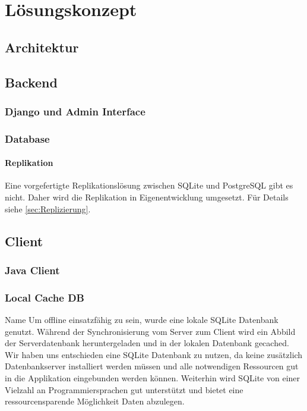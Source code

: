 \documentclass[12pt,a4paper,ngerman,english]{report}
\begin{document}
\chapter{Lösungskonzept}
\section{Architektur}
\section{Backend}
\subsection{Django und Admin Interface}
\subsection{Database}

\subsubsection{Replikation}

Eine vorgefertigte Replikationslösung zwischen SQLite und PostgreSQL gibt es nicht. Daher wird die Replikation in Eigenentwicklung umgesetzt. Für Details siehe \autoref{sec:Replizierung}.

\section{Client}
\subsection{Java Client}
\subsection{Local Cache DB}Name
Um offline einsatzfähig zu sein, wurde eine lokale SQLite Datenbank genutzt. Während der Synchronisierung vom Server zum Client wird ein Abbild der Serverdatenbank heruntergeladen und in der lokalen Datenbank gecached. Wir haben uns entschieden eine SQLite Datenbank zu nutzen, da keine zusätzlich Datenbankserver installiert werden müssen und alle notwendigen Ressourcen gut in die Applikation eingebunden werden können. Weiterhin wird SQLite von einer Vielzahl an Programmiersprachen gut unterstützt und bietet eine ressourcensparende Möglichkeit Daten abzulegen. \\
\end{document}
